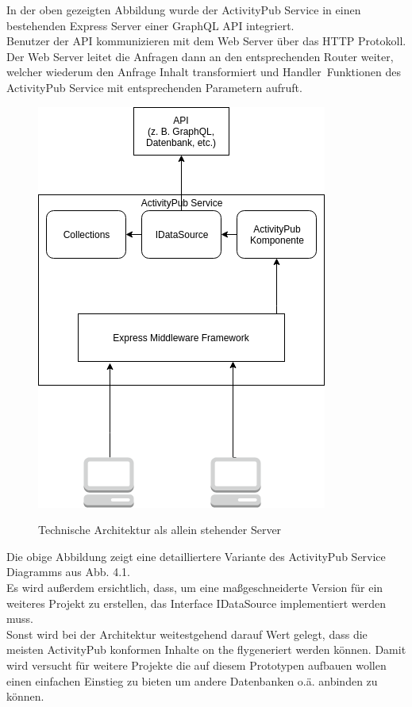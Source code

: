 	In der oben gezeigten Abbildung wurde der ActivityPub Service in einen bestehenden Express Server einer GraphQL API integriert.\\
	
	Benutzer der API kommunizieren mit dem Web Server über das HTTP Protokoll. Der Web Server leitet die Anfragen dann an den entsprechenden Router weiter, welcher wiederum den Anfrage Inhalt transformiert und \glqq Handler\grqq~Funktionen des ActivityPub Service mit entsprechenden Parametern aufruft.\\
	
	\begin{figure}[h]
		\begin{minipage}{\textwidth}
			\centering
			\includegraphics[scale=0.5]{figures/Technische-Architektur-standalone.png}
			\label{technische-architektur-standalone}
			\caption{Technische Architektur als allein stehender Server}
		\end{minipage}
	\end{figure}

	Die obige Abbildung zeigt eine detailliertere Variante des ActivityPub Service Diagramms aus Abb. 4.1.\\
	Es wird außerdem ersichtlich, dass, um eine maßgeschneiderte Version für ein weiteres Projekt zu erstellen, das Interface IDataSource implementiert werden muss.\\ 
	Sonst wird bei der Architektur weitestgehend darauf Wert gelegt, dass die meisten ActivityPub konformen Inhalte \glqq on the fly\grqq generiert werden können. Damit wird versucht für weitere Projekte die auf diesem Prototypen aufbauen wollen einen einfachen Einstieg zu bieten um andere Datenbanken o.ä. anbinden zu können.